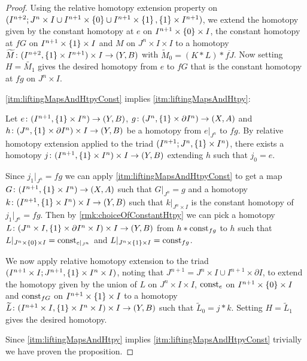 \begin{prop}
\begin{proof}
        Using the relative homotopy extension property on $(I^{n+2};J^n\times I\cup I^{n+1}\times\left\lbrace0\right\rbrace\cup I^{n+1}\times\left\lbrace1\right\rbrace,\left\lbrace1\right\rbrace\times I^{n+1})$, we extend the homotopy given by the constant homotopy at $e$ on $I^{n+1}\times\left\lbrace0\right\rbrace\times I$, the constant homotopy at $fG$ on $I^{n+1}\times\left\lbrace1\right\rbrace\times I$ and $M$ on $J^n\times I\times I$ to a homotopy $\widetilde{M}\colon(I^{n+2},\left\lbrace1\right\rbrace\times I^{n+1})\times I\to(Y,B)$ with $\widetilde{M}_0=(K*L)*\overline{fJ}$.
        Now setting $H=\widetilde{M_1}$ gives the desired homotopy from $e$ to $fG$ that is the constant homotopy at $fg$ on $J^n\times I$.
        
        \ref{itm:liftingMapsAndHtpyConst} implies \ref{itm:liftingMapsAndHtpy}:

        Let $e\colon(I^{n+1},\left\lbrace1\right\rbrace\times I^n)\to (Y,B)$, $g\colon(J^n,\left\lbrace1\right\rbrace\times\partial I^n)\to(X,A)$ and $h\colon(J^n,\left\lbrace1\right\rbrace\times\partial I^n)\times I\to(Y,B)$ be a homotopy from $e|_{J^n}$ to $fg$.
        By relative homotopy extension applied to the triad $(I^{n+1};J^n,\left\lbrace1\right\rbrace\times I^n)$, there exists a homotopy $j\colon(I^{n+1},\left\lbrace1\right\rbrace\times I^n)\times I\to(Y,B)$ extending $h$ such that $j_0=e$.
        
        Since $j_1|_{J^n}=fg$ we can apply \ref{itm:liftingMapsAndHtpyConst} to get a map $G\colon(I^{n+1},\left\lbrace1\right\rbrace\times I^n)\to(X,A)$ such that $G|_{J^n}=g$ and a homotopy $k\colon(I^{n+1},\left\lbrace1\right\rbrace\times I^n)\times I\to(Y,B)$ such that $k|_{J^n\times I}$ is the constant homotopy of $j_1|_{J^n}=fg$. 
        Then by \cref{rmk:choiceOfConstantHtpy} we can pick a homotopy $L\colon(J^n\times I,\left\lbrace1\right\rbrace\times\partial I^n\times I)\times I\to (Y,B)$ from $h*\operatorname{const}_{fg}$ to $h$ such that $L|_{J^n\times\left\lbrace0\right\rbrace\times I}=\operatorname{const}_{e|_{J^n}}$ and $L|_{J^n\times\left\lbrace1\right\rbrace\times I}=\operatorname{const}_{fg}$.
        
        We now apply relative homotopy extension to the triad $(I^{n+1}\times I;J^{n+1},\left\lbrace1\right\rbrace\times I^n\times I)$, noting that $J^{n+1}=J^n\times I\cup I^{n+1}\times\partial I$, to extend the homotopy given by the union of $L$ on $J^n\times I\times I$, $\operatorname{const}_e$ on $I^{n+1}\times\left\lbrace0\right\rbrace\times I$ and $\operatorname{const}_{fG}$ on $I^{n+1}\times\left\lbrace1\right\rbrace\times I$ to a homotopy $\widetilde{L}\colon(I^{n+1}\times I,\left\lbrace1\right\rbrace\times I^n\times I)\times I\to(Y,B)$ such that $\widetilde{L}_0=j*k$.
        Setting $H=\widetilde{L}_1$ gives the desired homotopy.


        Since \ref{itm:liftingMapsAndHtpy} implies \ref{itm:liftingMapsAndHtpyConst} trivially we have proven the proposition.
    \end{proof}
\end{prop}

